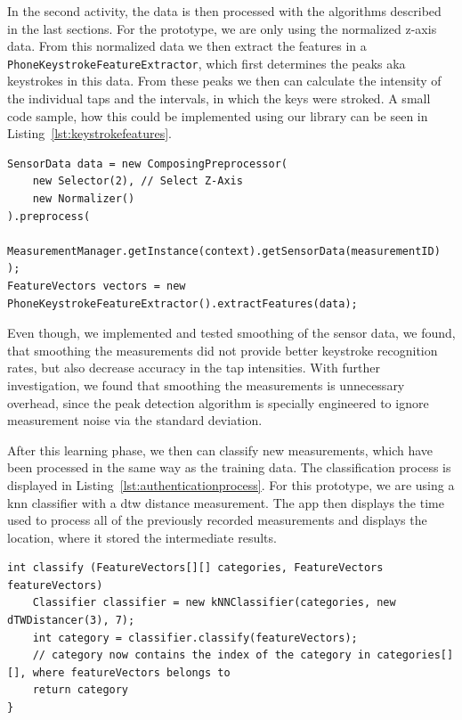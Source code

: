 In the second \gls{activity}, the data is then processed with the algorithms described in the last sections. For the prototype, we are only using the normalized z-axis data. From this normalized data we then extract the features in a \lstinline$PhoneKeystrokeFeatureExtractor$, which first determines the peaks aka keystrokes in this data. From these peaks we then can calculate the intensity of the individual taps and the intervals, in which the keys were stroked. A small code sample, how this could be implemented using our library can be seen in Listing~\ref{lst:keystrokefeatures}.

\begin{lstlisting}[float,
caption={Minimum working example to extract keystroke features},
label={lst:keystrokefeatures}]
SensorData data = new ComposingPreprocessor(
    new Selector(2), // Select Z-Axis
    new Normalizer()
).preprocess(
    MeasurementManager.getInstance(context).getSensorData(measurementID)
);
FeatureVectors vectors = new PhoneKeystrokeFeatureExtractor().extractFeatures(data);
\end{lstlisting}

Even though, we implemented and tested smoothing of the sensor data, we found, that smoothing the measurements did not provide better keystroke recognition rates, but also decrease accuracy in the tap intensities. With further investigation, we found that smoothing the measurements is unnecessary overhead, since the peak detection algorithm is specially engineered to ignore measurement noise via the standard deviation.

After this learning phase, we then can classify new measurements, which have been processed in the same way as the training data. The classification process is displayed in Listing~\ref{lst:authenticationprocess}. For this prototype, we are using a \gls{knn} classifier with a \gls{dtw} distance measurement. The \gls{app} then displays the time used to process all of the previously recorded measurements and displays the location, where it stored the intermediate results.

\begin{lstlisting}[float,
caption={Minimum working example to classify a given \lstinline$FeatureVectors$ according to previously learened \lstinline$categories$},
label={lst:authenticationprocess}]
int classify (FeatureVectors[][] categories, FeatureVectors featureVectors)
    Classifier classifier = new kNNClassifier(categories, new dTWDistancer(3), 7);
    int category = classifier.classify(featureVectors);
    // category now contains the index of the category in categories[][], where featureVectors belongs to
    return category
}
\end{lstlisting}

